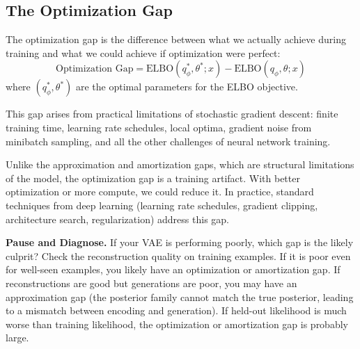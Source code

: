 \vspace{0.5em}

\subsection{The Optimization Gap}

The optimization gap is the difference between what we actually achieve during training and what we could achieve if optimization were perfect:
%
\begin{equation}
\text{Optimization Gap} = \text{ELBO}(q^*_\phi, \theta^*; x) - \text{ELBO}(q_\phi, \theta; x)
\end{equation}
%
where $(q^*_\phi, \theta^*)$ are the optimal parameters for the ELBO objective.

\vspace{0.3cm}

This gap arises from practical limitations of stochastic gradient descent: finite training time, learning rate schedules, local optima, gradient noise from minibatch sampling, and all the other challenges of neural network training.

\vspace{0.3cm}

Unlike the approximation and amortization gaps, which are structural limitations of the model, the optimization gap is a training artifact. With better optimization or more compute, we could reduce it. In practice, standard techniques from deep learning (learning rate schedules, gradient clipping, architecture search, regularization) address this gap.

\vspace{1.5em}

\begin{pausebox}
\textbf{Pause and Diagnose.} If your VAE is performing poorly, which gap is the likely culprit? Check the reconstruction quality on training examples. If it is poor even for well-seen examples, you likely have an optimization or amortization gap. If reconstructions are good but generations are poor, you may have an approximation gap (the posterior family cannot match the true posterior, leading to a mismatch between encoding and generation). If held-out likelihood is much worse than training likelihood, the optimization or amortization gap is probably large.
\end{pausebox}

\vspace{2em}

